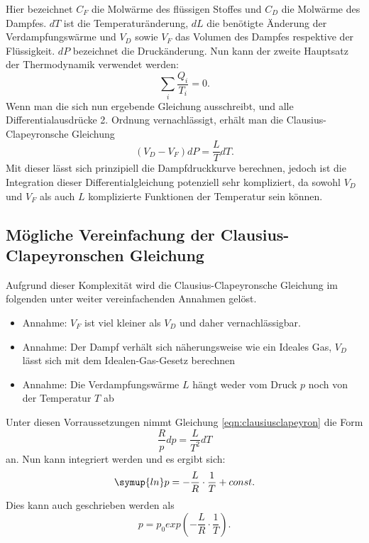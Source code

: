     Hier bezeichnet $C_{F}$ die Molwärme des flüssigen Stoffes und $C_{D}$ die Molwärme des Dampfes. $dT$ ist die
    Temperaturänderung, $dL$ die benötigte Änderung der Verdampfungswärme und $V_{D}$ sowie $V_{F}$ das Volumen des Dampfes
    respektive der Flüssigkeit. $dP$ bezeichnet die Druckänderung. Nun kann der zweite Hauptsatz der Thermodynamik verwendet
    werden:
    \begin{equation*}
      \label{eqn:zweiterhauptsatz}
      \sum_{i}^{} \frac{Q_{i}}{T_{i}} = 0.
    \end{equation*}
    Wenn man die sich nun ergebende Gleichung ausschreibt, und alle Differentialausdrücke 2. Ordnung vernachlässigt, erhält man
    die Clausius-Clapeyronsche Gleichung
    \begin{equation}
      \label{eqn:clausiusclapeyron}
      (V_{D} - V_{F})dP = \frac{L}{T} dT.
    \end{equation}
    Mit dieser lässt sich prinzipiell die Dampfdruckkurve berechnen, jedoch ist die Integration dieser Differentialgleichung
    potenziell sehr kompliziert, da sowohl $V_{D}$ und $V_{F}$ als auch $L$ komplizierte Funktionen der Temperatur sein können.
    \subsection{Mögliche Vereinfachung der Clausius-Clapeyronschen Gleichung}
    Aufgrund dieser Komplexität wird die Clausius-Clapeyronsche Gleichung im folgenden unter weiter vereinfachenden Annahmen
    gelöst.
    \begin{itemize}
      \item Annahme: $V_{F}$ ist viel kleiner als $V_{D}$ und daher vernachlässigbar.
      \item Annahme: Der Dampf verhält sich näherungsweise wie ein Ideales Gas, $V_{D}$ lässt sich mit dem Idealen-Gas-Gesetz
      berechnen
      \item Annahme: Die Verdampfungswärme $L$ hängt weder vom Druck $p$ noch von der Temperatur $T$ ab
    \end{itemize}
    Unter diesen Vorraussetzungen nimmt Gleichung \eqref{eqn:clausiusclapeyron} die Form
    \begin{equation*}
      \frac{R}{p} dp = \frac{L}{T^{2}} dT
    \end{equation*}
    an. Nun kann integriert werden und es ergibt sich:
    \begin{equation}
      \label{clausiusclapeyronintegriertln}
      \symup{ln}p = - \frac{L}{R} \cdot \frac{1}{T} + const.
    \end{equation}
    Dies kann auch geschrieben werden als
    \begin{equation}
      \label{clausiusclapeyronintegriertexp}
      p = p_{0} exp(- \frac{L}{R} \cdot \frac{1}{T}).
    \end{equation}
\label{sec:Theorie}
